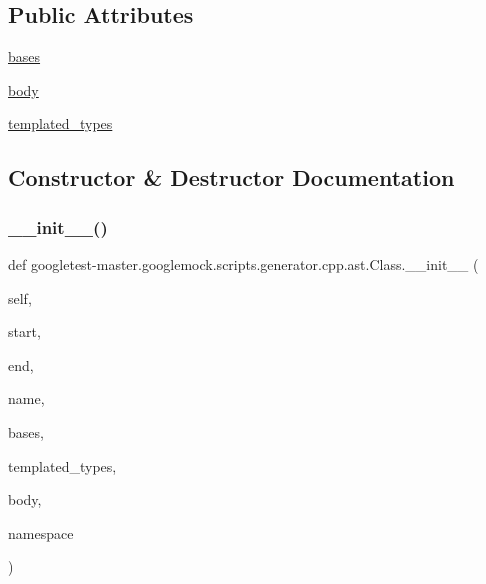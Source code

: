\subsection*{Public Attributes}
\begin{DoxyCompactItemize}
\item 
\mbox{\hyperlink{classgoogletest-master_1_1googlemock_1_1scripts_1_1generator_1_1cpp_1_1ast_1_1_class_a80ca8b5a6f9978550f137cb10abb1de3}{bases}}
\item 
\mbox{\hyperlink{classgoogletest-master_1_1googlemock_1_1scripts_1_1generator_1_1cpp_1_1ast_1_1_class_a868debe7fdd945622b31e888f9f37707}{body}}
\item 
\mbox{\hyperlink{classgoogletest-master_1_1googlemock_1_1scripts_1_1generator_1_1cpp_1_1ast_1_1_class_a1cabff5f0ced4a0d63c214a691f50d96}{templated\+\_\+types}}
\end{DoxyCompactItemize}


\subsection{Constructor \& Destructor Documentation}
\mbox{\label{classgoogletest-master_1_1googlemock_1_1scripts_1_1generator_1_1cpp_1_1ast_1_1_class_a8edc0179969d71db058163865fa2c256}} 
\subsubsection{\texorpdfstring{\_\_init\_\_()}{\_\_init\_\_()}}
{\footnotesize\ttfamily def googletest-\/master.\+googlemock.\+scripts.\+generator.\+cpp.\+ast.\+Class.\+\_\+\+\_\+init\+\_\+\+\_\+ (\begin{DoxyParamCaption}\item[{}]{self,  }\item[{}]{start,  }\item[{}]{end,  }\item[{}]{name,  }\item[{}]{bases,  }\item[{}]{templated\+\_\+types,  }\item[{}]{body,  }\item[{}]{namespace }\end{DoxyParamCaption})}




